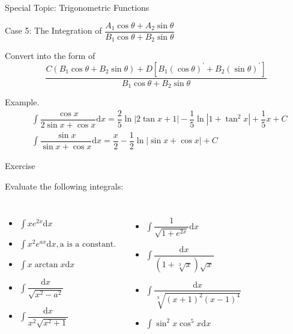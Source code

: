 \documentclass[aspectratio=169, UTF8]{ctexbeamer}
\begin{document}
    \begin{frame}[t]{Special Topic: Trigonometric Functions}
        \begin{block}{Case 5: The Integration of $\dfrac{A_{1} \cos \theta+A_{2} \sin \theta}{B_{1} \cos \theta+B_{2} \sin \theta}$}
        \par Convert into the form of $$\dfrac{C\left(B_{1} \cos \theta+B_{2} \sin \theta\right)+D\left[B_{1}(\cos \theta)^{\prime}+B_{2}(\sin \theta)^{\prime}\right]}{B_{1} \cos \theta+B_{2} \sin \theta}$$
        \end{block}
        \par \textcolor{yy}{Example.}
        \begin{equation*}\begin{aligned}
            & \int \dfrac{\cos x}{2 \sin x+\cos x} \mathrm{d} x = \dfrac{2}{5} \ln |2 \tan x+1|-\dfrac{1}{5} \ln \left|1+\tan ^{2} x\right|+\dfrac{1}{5} x+C\\
            & \int \dfrac{\sin x}{\sin x+\cos x} \mathrm{d} x = \dfrac{x}{2}-\dfrac{1}{2} \ln |\sin x+\cos x|+C
        \end{aligned}\end{equation*}
    \end{frame}

    \begin{frame}[t]{Exercise}
        \par Evaluate the following integrals:
        \begin{columns}[c]
            \begin{itemize}
                \item $\int x e^{2 x} \mathrm{d}x$
                \item $\int x^{2} e^{a x} \mathrm{d}x, \text {a is a constant. } $
                \item $\int x\arctan x \mathrm{d}x$   
                \item $\int \dfrac{\mathrm{d} x}{\sqrt{x^{2}-a^{2}}}$
                \item $\int \dfrac{\mathrm{d} x}{x^{2} \sqrt{x^{2}+1}}$
            \end{itemize}
        
            \begin{itemize}
                \item $\int \dfrac{1}{\sqrt{1+e^{2 x}}} \mathrm{d} x$
                \item $\int \dfrac{\mathrm{d} x}{(1+\sqrt[3]{x}) \sqrt{x}}$
                \item $\int \dfrac{\mathrm{d} x}{\sqrt[3]{(x+1)^{2}(x-1)^{4}}}$
                \item $\int \sin ^{2} x \cos ^{5} x \mathrm{d}x$
            \end{itemize}
        \end{columns}
    \end{frame}  
\end{document}
